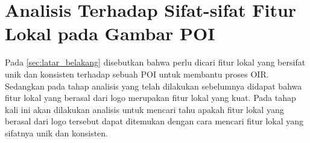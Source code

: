 \section{Analisis Terhadap Sifat-sifat Fitur Lokal pada Gambar POI}
Pada \ref{sec:latar_belakang} disebutkan bahwa perlu dicari fitur lokal yang bersifat unik dan konsisten terhadap sebuah POI untuk membantu proses OIR. Sedangkan pada tahap analisis yang telah dilakukan sebelumnya didapat bahwa fitur lokal yang berasal dari logo merupakan fitur lokal yang kuat. Pada tahap kali ini akan dilakukan analisis untuk mencari tahu apakah fitur lokal yang berasal dari logo tersebut dapat ditemukan dengan cara mencari fitur lokal yang sifatnya unik dan konsisten.

 





